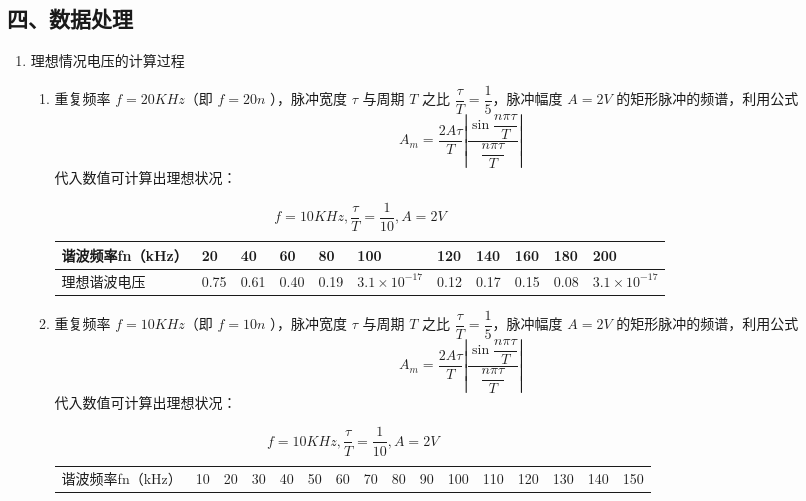 \documentclass[dvipsnames, svgnames,a4paper,11pt]{article}
\begin{document}
\subsection*{四、数据处理}
  \begin{enumerate}
    \item 理想情况电压的计算过程
      \begin{enumerate}
        \item 重复频率 $f = 20KHz$（即 $f = 20n$ ），脉冲宽度 $\tau$ 与周期 $T$ 之比 $\dfrac{\tau}{T} = \dfrac{1}{5}$，脉冲幅度 $A = 2V$ 的矩形脉冲的频谱，利用公式
          \begin{equation*}
            A_m = \dfrac{2A\tau}{T}\left |\dfrac{\sin \dfrac{n\pi\tau}{T}}{\dfrac{n\pi\tau}{T}} \right |
          \end{equation*}
          代入数值可计算出理想状况：
          \begin{table}[htbp]
            \renewcommand\arraystretch{1.7}
            \centering
            \caption{$f = 10KHz, \dfrac{\tau}{T} = \dfrac{1}{10}, A = 2V$}
            \begin{tabularx}{\textwidth}{|p{}|X|X|X|X|X|X|X|X|X|X|}
              \hline
              谐波频率fn（kHz） & 20 & 40 & 60 & 80 & 100 & 120 & 140 & 160 & 180 & 200 \\
              \hline
              理想谐波电压 & 0.75 & 0.61 & 0.40 & 0.19 & $3.1 \times 10^{-17}$ & 0.12 & 0.17 & 0.15 & 0.08 & $3.1 \times 10^{-17}$ \\
              \hline
            \end{tabularx}
          \end{table}
        \item 重复频率 $f = 10KHz$（即 $f = 10n$ ），脉冲宽度 $\tau$ 与周期 $T$ 之比 $\dfrac{\tau}{T} = \dfrac{1}{5}$，脉冲幅度 $A = 2V$ 的矩形脉冲的频谱，利用公式
          \begin{equation*}
            A_m = \dfrac{2A\tau}{T}\left |\dfrac{\sin \dfrac{n\pi\tau}{T}}{\dfrac{n\pi\tau}{T}} \right |
          \end{equation*}
          代入数值可计算出理想状况：
          \begin{table}[htbp]
            \renewcommand\arraystretch{1.7}
            \centering
            \caption{$f = 10KHz, \dfrac{\tau}{T} = \dfrac{1}{10}, A = 2V$}
            \begin{tabularx}{\textwidth}{|p{}|X|X|X|X|X|X|X|X|X|X|X|X|X|X|X|}
              \hline
              谐波频率fn（kHz） & 10 & 20 & 30 & 40 & 50 & 60 & 70 & 80 & 90 & 100 & 110 & 120 & 130 & 140 & 150 \\

\end{tabularx}
\end{table}
\end{enumerate}
\end{enumerate}
\end{document}
